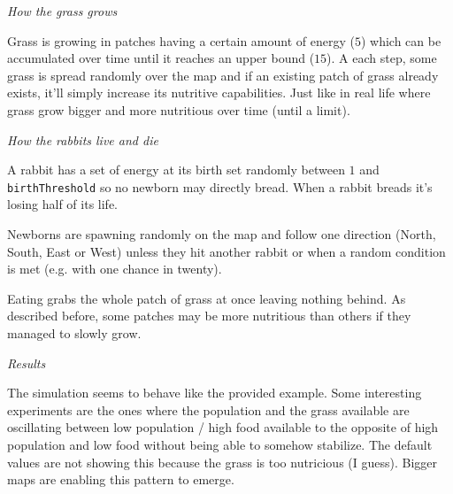 \documentclass[11pt,a4paper]{article}
\begin{document}
\newpage
\medskip
\emph{How the grass grows}

Grass is growing in patches having a certain amount of energy ($5$) which can be
accumulated over time until it reaches an upper bound ($15$). A each step, some
grass is spread randomly over the map and if an existing patch of grass already
exists, it'll simply increase its nutritive capabilities. Just like in real
life where grass grow bigger and more nutritious over time (until a limit).

\medskip
\emph{How the rabbits live and die}

A rabbit has a set of energy at its birth set randomly between $1$ and
\texttt{birthThreshold} so no newborn may directly bread. When a rabbit breads
it's losing half of its life.

Newborns are spawning randomly on the map and follow one direction (North,
South, East or West) unless they hit another rabbit or when a random condition
is met (e.g. with one chance in twenty).

Eating grabs the whole patch of grass at once leaving nothing behind. As
described before, some patches may be more nutritious than others if they
managed to slowly grow.

\medskip
\emph{Results}

The simulation seems to behave like the provided example. Some interesting
experiments are the ones where the population and the grass available
are oscillating between low population / high food available to the opposite
of high population and low food without being able to somehow stabilize. The
default values are not showing this because the grass is too nutricious (I
guess). Bigger maps are enabling this pattern to emerge.
\end{document}
